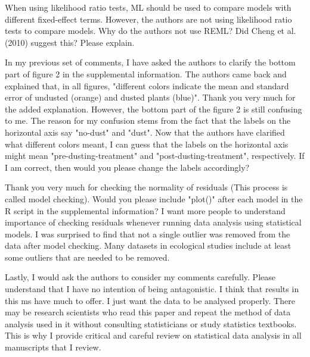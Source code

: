 \documentclass[parskip=half]{scrartcl}
\begin{document}
When using likelihood ratio tests, ML should be used to compare models with different fixed-effect terms.
However, the authors are not using likelihood ratio tests to compare models.
Why do the authors not use REML?
Did Cheng et al. (2010) suggest this?
Please explain.

In my previous set of comments, I have asked the authors to clarify the bottom part of figure 2 in the supplemental information. 
The authors came back and explained that, in all figures, "different colors indicate the mean and standard error of undusted (orange) and dusted plants (blue)".
Thank you very much for the added explanation.
However, the bottom part of the figure 2 is still confusing to me.
The reason for my confusion stems from the fact that the labels on the horizontal axis say "no-dust" and "dust".
Now that the authors have clarified what different colors meant, I can guess that the labels on the horizontal axis might mean "pre-dusting-treatment" and "post-dusting-treatment", respectively.
If I am correct, then would you please change the labels accordingly?

Thank you very much for checking the normality of residuals (This process is called model checking).
Would you please include "plot()" after each model in the R script in the supplemental information?
I want more people to understand importance of checking residuals whenever running data analysis using statistical models.
I was surprised to find that not a single outlier was removed from the data after model checking.
Many datasets in ecological studies include at least some outliers that are needed to be removed.

Lastly, I would ask the authors to consider my comments carefully.  Please understand that I have no intention of being antagonistic.  I think that results in this ms have much to offer.  I just want the data to be analysed properly.  There may be research scientists who read this paper and repeat the method of data analysis used in it without consulting statisticians or study statistics textbooks.  This is why I provide critical and careful review on statistical data analysis in all manuscripts that I review.
\end{document}

